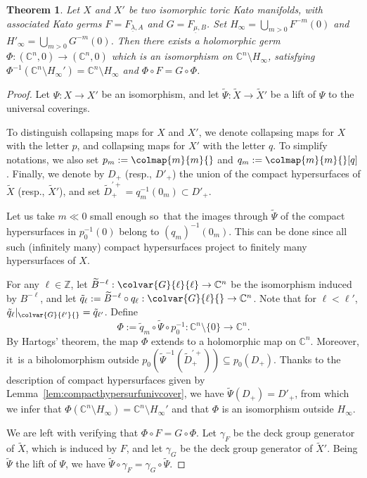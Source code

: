 \documentclass[JEP,XML,SOM,Unicode,NoFloatCountersInSection]{cedram}
\newtheorem{theorem}{Theorem}[section]
\theoremstyle{definition}
\let\wt\widetilde
\let\la\lambda
\let\un\underline
\newcommand{\CC}{\mathbb{C}}
\newcommand{\ZZ}{\mathbb{Z}}
\begin{document}
\begin{theorem}\label{thm:generaliso}
Let $X$ and $X'$ be two isomorphic toric Kato manifolds, with associated Kato germs $F=F_{\un\la,A}$ and $G=F_{\un\mu,B}$.
Set $H_\infty=\bigcup_{m>0}F^{-m}(0)$ and $H'_\infty=\bigcup_{m>0}G^{-m}(0)$.
Then there exists a holomorphic germ $\Phi:(\CC^n,0) \to (\CC^n,0)$ which is an isomorphism on $\CC^n \setminus H_\infty$, satisfying $\Phi^{-1}(\CC^n \setminus H_\infty') = \CC^n \setminus H_\infty$ and $\Phi \circ F = G \circ \Phi$.
\end{theorem}
\begin{proof}
Let $\Psi:X \to X'$ be an isomorphism, and let $\wt{\Psi}:\wt{X} \to \wt{X}'$ be a lift of $\Psi$ to the universal coverings.

To distinguish collapsing maps for $X$ and $X'$, we denote collapsing maps for $X$ with the letter $p$, and collapsing maps for $X'$ with the letter $q$.
To simplify notations, we also set $p_m:= \colmap{m}{m}{}$ and $q_m:= \colmap{m}{m}{}[q]$.
Finally, we denote by $D_+$ (resp., $D'_+$) the union of the compact hypersurfaces of $\wt{X}$ (resp., $\wt{X}'$), and set $\wt{D}_+^{'+}=q_m^{-1}(0_m) \subset D'_+$.

Let us take $m \ll 0$ small enough so~that the images through $\wt{\Psi}$ of the compact hyper\-surfaces in $p_0^{-1}(0)$ belong to $(q_{m})^{-1}(0_m)$. This can be done since all such (infinitely many) compact hypersurfaces project to finitely many hypersurfaces of $X$.

For any $\ell\in\ZZ$, let $\wt{B}^{-\ell}:\colvar{G}{\ell}{\ell}\to \CC^n$ be the isomorphism induced by $B^{-\ell}$, and let $\tilde q_\ell:=\wt{B}^{-\ell}\circ q_\ell:\colvar{G}{\ell}{}\to\CC^n$. Note that for $\ell<\ell'$, $\tilde q_{\ell}|_{\colvar{G}{\ell'}{}}=\tilde q_{\ell'}$. Define
\begin{equation*}
\Phi:=\tilde q_m \circ \wt{\Psi} \circ p_0^{-1}:\CC^n\setminus\{0\}\to \CC^n.
\end{equation*}
By Hartogs' theorem, the map $\Phi$ extends to a holomorphic map on $\CC^n$. Moreover, it~is a biholomorphism outside $p_0(\wt{\Psi}^{-1}(\wt{D}_+^{'+}))\subseteq p_0(D_+)$. Thanks to the description of compact hypersurfaces given by Lemma~\ref{lem:compacthypersurfunivcover}, we have $\wt{\Psi}(D_+)=D'_+$, from which we infer that $\Phi(\CC^n\setminus H_\infty)=\CC^n\setminus H_\infty'$ and that $\Phi$ is an isomorphism outside $H_\infty$.

We are left with verifying that $\Phi\circ F=G\circ \Phi$. Let $\gamma_F$ be the deck group generator of $\tilde X$, which is induced by $F$, and let $\gamma_G$ be the deck group generator of $\tilde X'$. Being $\wt{\Psi}$ the lift of $\Psi$, we have $\wt{\Psi} \circ \gamma_F=\gamma_G \circ \wt{\Psi}$.


\end{proof}
\end{document}
